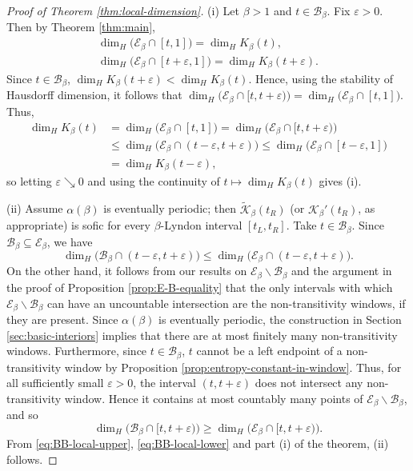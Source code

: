 \documentclass[11pt]{amsart}
\theoremstyle{definition}
\theoremstyle{remark}
\numberwithin{equation}{section}
\newcommand{\BB}{\mathscr{B}}
\newcommand{\EE}{\mathscr{E}}
\newcommand{\Kt}{\widetilde{\mathcal{K}}}
\newcommand{\ep}{\varepsilon}
\newcommand{\al}{\alpha}
\begin{document}
\begin{proof}[Proof of Theorem \ref{thm:local-dimension}]
(i) Let $\beta{>1}$ and $t\in\BB_\beta$. Fix $\ep>0$. Then by Theorem \ref{thm:main},
\begin{gather*}
\dim_H\big(\EE_\beta\cap[t,1]\big)=\dim_H K_\beta(t),\\
\dim_H\big(\EE_\beta\cap[t+\ep,1]\big)=\dim_H K_\beta(t+\ep).
\end{gather*}
Since $t\in\BB_\beta$, $\dim_H K_\beta(t+\ep)<\dim_H K_\beta(t)$. Hence, using the stability of Hausdorff dimension, it follows that $\dim_H\big(\EE_\beta\cap[t,t+\ep)\big)=\dim_H\big(\EE_\beta\cap[t,1]\big)$. Thus,
\begin{align*}
\dim_H K_\beta(t)&=\dim_H\big(\EE_\beta\cap[t,1]\big)=\dim_H\big(\EE_\beta\cap[t,t+\ep)\big)\\
&\leq \dim_H\big(\EE_\beta\cap(t-\ep,t+\ep)\big)\leq \dim_H\big(\EE_\beta\cap[t-\ep,1]\big)\\
&=\dim_H K_\beta(t-\ep),
\end{align*}
so letting $\ep\searrow 0$ and using the continuity of $t\mapsto \dim_H K_\beta(t)$ gives (i).

(ii) Assume $\al(\beta)$ is eventually periodic; then $\Kt_\beta(t_R)$ (or $\mathcal{K}_\beta'(t_R)$, as appropriate) is sofic for every $\beta$-Lyndon interval $[t_L,t_R]$. Take $t\in\BB_\beta$. Since $\BB_\beta\subseteq\EE_\beta$, we have
\begin{equation} \label{eq:BB-local-upper}
\dim_H\big(\BB_\beta\cap(t-\ep,t+\ep)\big)\leq \dim_H\big(\EE_\beta\cap(t-\ep,t+\ep)\big).
\end{equation}
On the other hand, it follows from our results on $\EE_\beta\backslash\BB_\beta$ and the argument in the proof of Proposition \ref{prop:E-B-equality} that the only intervals with which $\EE_\beta\backslash\BB_\beta$ can have an uncountable intersection are the non-transitivity windows, if they are present. Since $\al(\beta)$ is eventually periodic, the construction in Section \ref{sec:basic-interiors} implies that there are at most finitely many non-transitivity windows. Furthermore, since $t\in\BB_\beta$, $t$ cannot be a left endpoint of a non-transitivity window by Proposition \ref{prop:entropy-constant-in-window}. Thus, for all sufficiently small $\ep>0$, the interval $(t,t+\ep)$ does not intersect any non-transitivity window. Hence it contains at most countably many points of $\EE_\beta\backslash\BB_\beta$, and so
\begin{equation} \label{eq:BB-local-lower}
\dim_H\big(\BB_\beta\cap[t,t+\ep)\big)\geq \dim_H\big(\EE_\beta\cap[t,t+\ep)\big).
\end{equation}
From \eqref{eq:BB-local-upper}, \eqref{eq:BB-local-lower} and part (i) of the theorem, (ii) follows.
\end{proof}
\end{document}
